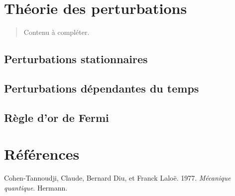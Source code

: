 \documentclass[
  french,
  11pt,
  letterpaper,
]{book}
\newlength{\cslhangindent}
\newenvironment{CSLReferences}[2] %
 {\begin{list}{}{%
  \setlength{\itemindent}{0pt}
  \setlength{\leftmargin}{0pt}
  \setlength{\parsep}{0pt}
  \ifodd #1
   \setlength{\leftmargin}{\cslhangindent}
   \setlength{\itemindent}{-1\cslhangindent}
  \fi
  \setlength{\itemsep}{#2\baselineskip}}}
 {\end{list}}
\begin{document}

\chapter{Théorie des perturbations}\label{thuxe9orie-des-perturbations}

\begin{quote}
Contenu à compléter.
\end{quote}

\section{Perturbations stationnaires}\label{perturbations-stationnaires}

\section{Perturbations dépendantes du
temps}\label{perturbations-duxe9pendantes-du-temps}

\section{Règle d'or de Fermi}\label{ruxe8gle-dor-de-fermi}


\chapter*{Références}\label{ruxe9fuxe9rences}


\protect{}\label{refs}
\begin{CSLReferences}{1}{1}
Cohen-Tannoudji, Claude, Bernard Diu, et Franck Laloë. 1977.
\emph{M{é}canique quantique}. Hermann.

\end{CSLReferences}


\backmatter
\end{document}

